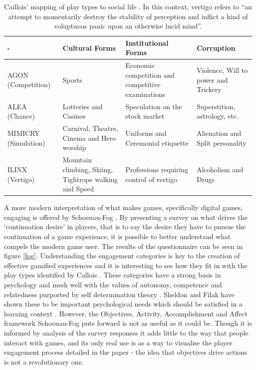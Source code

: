 \documentclass[12pt,a4paper,twoside]{report}
\begin{document}
\begin{table}
	\begin{center}
	\begin{tabu} to \textwidth {|X|X|X|X|}
		\hline - & Cultural Forms & Institutional Forms & Corruption \\ 
		\hline AGON (Competition) & Sports & Economic competition and competitive examinations & Violence, Will to power and Trickery \\ 
		\hline ALEA (Chance) & Lotteries and Casinos & Speculation on the stock market & Superstition, astrology, etc. \\ 
		\hline MIMICRY (Simulation) & Carnival, Theatre, Cinema and Hero worship & Uniforms and Ceremonial etiquette & Alienation and Split personality \\ 
		\hline ILINX (Vertigo) & Mountain climbing, Skiing, Tightrope walking and Speed & Professions requiring control of vertigo & Alcoholism and Drugs \\ 
		\hline 
	\end{tabu}
	\end{center}
	\caption{Caillois' mapping of play types to social life \cite{caillois1961man}. In this context, vertigo refers to ``an attempt to momentarily destroy the stability of perception and inflict a kind of voluptuous panic upon an otherwise lucid mind''.}
	\label{table:corruption}
\end{table}

A more modern interpretation of what makes games, specifically digital games, engaging is offered by Schoenau-Fog \cite{schoenau2011player}. By presenting a survey on what drives the `continuation desire' in players, that is to say the desire they have to pursue the continuation of a game experience, it is possible to better understand what compels the modern game user. The results of the questionnaire can be seen in figure \ref{fog}. Understanding the engagement categories is key to the creation of effective gamified experiences and it is interesting to see how they fit in with the play types identified by Callois \cite{caillois1961man}. These categories have a strong basis in psychology and mesh well with the values of autonomy, competence and relatedness purported by self determination theory \cite{deci1985intrinsic}. Sheldon and Filak have shown these to be important psychological needs which should be satisfied in a learning context \cite{sheldon2008manipulating}. However, the Objectives, Activity, Accomplishment and Affect framework Schoenau-Fog puts forward is not as useful as it could be. Though it is informed by analysis of the survey responses it adds little to the way that people interact with games, and its only real use is as a way to visualise the player engagement process detailed in the paper - the idea that objectives drive actions is not a revolutionary one.
\end{document}
